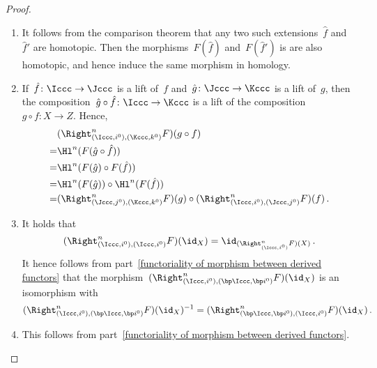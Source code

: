\begin{proof}
  \leavevmode
  \begin{enumerate}
    \item
      It follows from the comparison theorem that any two such extensions~$\hat{f}$ and~$\hat{f}'$ are homotopic.
      Then the morphisms~$F(\hat{f})$ and~$F(\hat{f}')$ is are also homotopic, and hence induce the same morphism in homology.
    \item
      If~$\hat{f} \colon \Iccc \to \Jccc$ is a lift of~$f$ and~$\hat{g} \colon \Jccc \to \Kccc$ is a lift of~$g$, then the composition~$\hat{g} \circ \hat{f} \colon \Iccc \to \Kccc$ is a lift of the composition~$g \circ f \colon X \to Z$.
      Hence,
      \begin{align*}
         &{}  (\Right^n_{(\Iccc,i^0), (\Kccc,k^0)} F)(g \circ f)  \\
        =&{}  \Hl^n( F(\hat{g} \circ \hat{f}) ) \\
        =&{}  \Hl^n( F(\hat{g}) \circ F(\hat{f}) )  \\
        =&{}  \Hl^n( F(\hat{g}) ) \circ \Hl^n( F(\hat{f}) ) \\
        =&{}  (\Right^n_{(\Jccc,j^0), (\Kccc,k^0)} F)(g)
              \circ
              (\Right^n_{(\Iccc,i^0), (\Jccc,j^0)} F)(f)  \,.
      \end{align*}
    \item
      It holds that
      \[
        (\Right^n_{(\Iccc,i^0), (\Iccc, i^0)} F)(\id_X) 
        =
        \id_{(\Right^n_{(\Iccc,i^0)} F)(X)} \,.
      \]
      It hence follows from part~\ref*{functoriality of morphism between derived functors} that the morphism~$(\Right^n_{(\Iccc,i^0), (\bp\Iccc, \bp i^0)} F)(\id_X)$ is an isomorphism with
      \[
          (\Right^n_{(\Iccc,i^0), (\bp\Iccc, \bp i^0)} F)(\id_X)^{-1}
        = (\Right^n_{(\bp\Iccc, \bp i^0), (\Iccc,i^0)} F)(\id_X) \,.
      \]
    \item
      This follows from part~\ref*{functoriality of morphism between derived functors}.
    \qedhere
  \end{enumerate}
\end{proof}











